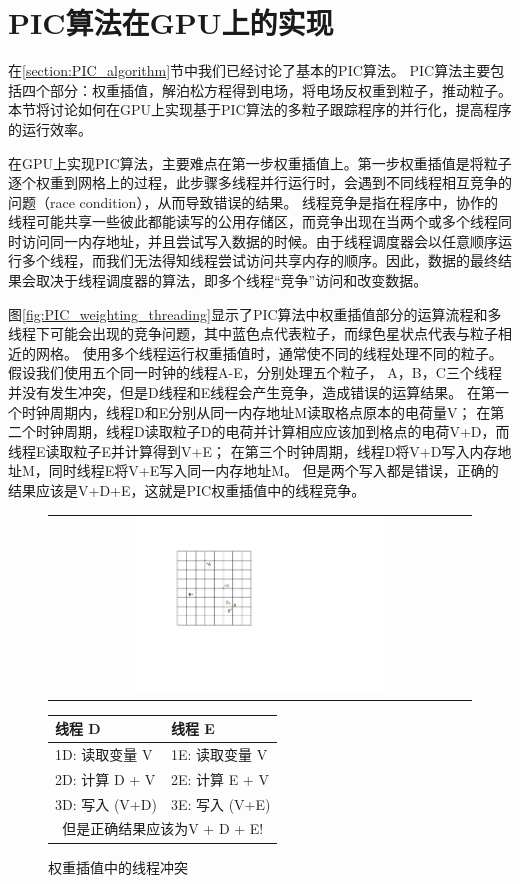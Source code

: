 \section{PIC算法在GPU上的实现}
在\eqref{section:PIC_algorithm}节中我们已经讨论了基本的PIC算法。
PIC算法主要包括四个部分：权重插值，解泊松方程得到电场，将电场反权重到粒子，推动粒子。
本节将讨论如何在GPU上实现基于PIC算法的多粒子跟踪程序的并行化，提高程序的运行效率。

在GPU上实现PIC算法，主要难点在第一步权重插值上。第一步权重插值是将粒子逐个权重到网格上的过程，此步骤多线程并行运行时，会遇到不同线程相互竞争的问题（race condition），从而导致错误的结果。
线程竞争是指在程序中，协作的线程可能共享一些彼此都能读写的公用存储区，而竞争出现在当两个或多个线程同时访问同一内存地址，并且尝试写入数据的时候。由于线程调度器会以任意顺序运行多个线程，而我们无法得知线程尝试访问共享内存的顺序。因此，数据的最终结果会取决于线程调度器的算法，即多个线程“竞争”访问和改变数据。

图\eqref{fig:PIC_weighting_threading}显示了PIC算法中权重插值部分的运算流程和多线程下可能会出现的竞争问题，其中蓝色点代表粒子，而绿色星状点代表与粒子相近的网格。
使用多个线程运行权重插值时，通常使不同的线程处理不同的粒子。假设我们使用五个同一时钟的线程A-E，分别处理五个粒子，
A，B，C三个线程并没有发生冲突，但是D线程和E线程会产生竞争，造成错误的运算结果。
在第一个时钟周期内，线程D和E分别从同一内存地址M读取格点原本的电荷量V；
在第二个时钟周期，线程D读取粒子D的电荷并计算相应应该加到格点的电荷V+D，而线程E读取粒子E并计算得到V+E；
在第三个时钟周期，线程D将V+D写入内存地址M，同时线程E将V+E写入同一内存地址M。
但是两个写入都是错误，正确的结果应该是V+D+E，这就是PIC权重插值中的线程竞争。

\begin{figure}[!htb]
  \centering
  \begin{tabular}{|l|l|}
    \multicolumn{2}{c}{
    \includegraphics[width=0.6\textwidth]{Img/3PIC_weighting.pdf}} \\
  \end{tabular}
  \begin{tabular}{|l|l|}
    \hline
    线程 D & 线程 E  \\
    \hline
    1D: 读取变量 V     & 1E: 读取变量 V     \\
    2D: 计算 D + V     & 2E: 计算 E + V \\
    3D: 写入 (V+D)    & 3E: 写入 (V+E)    \\
    \hline
    \multicolumn{2}{c}{但是正确结果应该为V + D + E!}
  \end{tabular}
  \caption{权重插值中的线程冲突}
  \label{fig:PIC_weighting_threading}
\end{figure}

